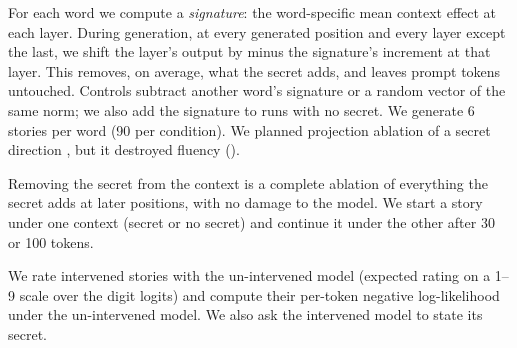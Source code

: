 For each word we compute a \emph{signature}: the word-specific mean context effect at each layer.
During generation, at every generated position and every layer except the last, we shift the layer's output by minus the signature's increment at that layer.
This removes, on average, what the secret adds, and leaves prompt tokens untouched.
Controls subtract another word's signature or a random vector of the same norm; we also add the signature to runs with no secret.
We generate 6 stories per word (90 per condition).
We planned projection ablation of a secret direction \citep{arditi2024refusal}, but it destroyed fluency ().

Removing the secret from the context is a complete ablation of everything the secret adds at later positions, with no damage to the model.
We start a story under one context (secret or no secret) and continue it under the other after 30 or 100 tokens.

We rate intervened stories with the un-intervened model (expected rating on a 1--9 scale over the digit logits) and compute their per-token negative log-likelihood under the un-intervened model.
We also ask the intervened model to state its secret.
